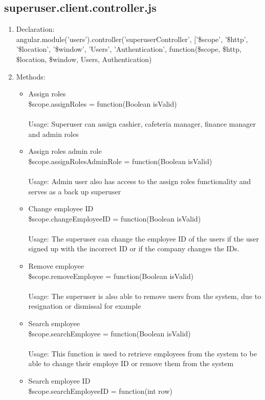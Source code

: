 \documentclass[a4paper,12pt]{article}
\begin{document}
\subsection{superuser.client.controller.js}
\begin{enumerate}
\item Declaration: \\ angular.module('users').controller('superuserController', ['\$scope', '\$http', '\$location', '\$window', 'Users', 'Authentication',
	function(\$scope, \$http, \$location, \$window, Users, Authentication)  
\item Methods: 
	\begin{itemize}
		\item Assign roles \\ \$scope.assignRoles = function(Boolean isValid)   \\ \\
		Usage: Superuser can assign cashier, cafeteria manager, finance manager and admin roles
		\item Assign roles admin role \\ \$scope.assignRolesAdminRole = function(Boolean isValid) \\ \\
		Usage: Admin user also has access to the assign roles functionality and serves as a back up superuser
		\item Change employee ID \\ \$scope.changeEmployeeID = function(Boolean isValid)\\ \\
		Usage: The superuser can change the employee ID of the users if the user signed up with the incorrect ID or if the company changes the IDs.
		\item Remove employee \\ \$scope.removeEmployee = function(Boolean isValid)  
		\\ \\ Usage: The superuser is also able to remove users from the system, due to resignation or dismissal for example
		\item Search employee \\ \$scope.searchEmployee = function(Boolean isValid)  
		\\ \\ Usage: This function is used to retrieve employees from the system to be able to change their employe ID or remove them from the system
		\item Search employee ID \\ \$scope.searchEmployeeID = function(int row)  

\end{itemize}
\end{enumerate}
\end{document}
